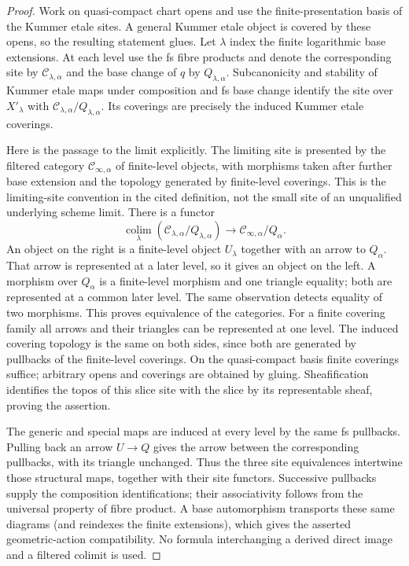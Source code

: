 \documentclass[11pt]{article}
\theoremstyle{definition}
\theoremstyle{remark}
\begin{document}
\begin{proof}
Work on quasi-compact chart opens and use the finite-presentation
basis of the Kummer etale sites.  A general Kummer etale object is
covered by these opens, so the resulting statement glues.
Let $\lambda$ index the finite logarithmic base extensions.  At each
level use the fs fibre products and denote the corresponding site
by $\mathcal C_{\lambda,\alpha}$ and the base change of $q$ by
$Q_{\lambda,\alpha}$.  Subcanonicity and stability of Kummer etale
maps under composition and fs base change identify the site over
$X'_\lambda$ with
$\mathcal C_{\lambda,\alpha}/Q_{\lambda,\alpha}$.
Its coverings are precisely the induced Kummer etale coverings.

Here is the passage to the limit explicitly.  The limiting site is
presented by the filtered category $\mathcal C_{\infty,\alpha}$
of finite-level objects, with morphisms taken after further base
extension and the topology generated by finite-level coverings.
This is the limiting-site convention in the cited definition, not
the small site of an unqualified underlying scheme limit.
There is a functor
\[
 \operatorname*{colim}_\lambda
 (\mathcal C_{\lambda,\alpha}/Q_{\lambda,\alpha})
 \longrightarrow \mathcal C_{\infty,\alpha}/Q_\alpha.
\]
An object on the right is a finite-level object $U_\lambda$ together
with an arrow to $Q_\alpha$.  That arrow is represented at a later
level, so it gives an object on the left.  A morphism over $Q_\alpha$
is a finite-level morphism and one triangle equality; both are
represented at a common later level.  The same observation detects
equality of two morphisms.  This proves equivalence of the categories.
For a finite covering family all arrows and their triangles can be
represented at one level.  The induced covering topology is the
same on both sides, since both are generated by pullbacks of the
finite-level coverings.  On the quasi-compact basis finite coverings
suffice; arbitrary opens and coverings are obtained by gluing.
Sheafification identifies the topos of this slice site with the
slice by its representable sheaf, proving the assertion.

The generic and special maps are induced at every level by the
same fs pullbacks.  Pulling back an arrow $U\to Q$ gives the arrow
between the corresponding pullbacks, with its triangle unchanged.
Thus the three site equivalences intertwine those structural maps,
together with their site functors.  Successive pullbacks supply
the composition identifications; their associativity follows from
the universal property of fibre product.  A base automorphism
transports these same diagrams (and reindexes the finite extensions),
which gives the asserted geometric-action compatibility.  No formula
interchanging a derived direct image and a filtered colimit is used.
\end{proof}
\end{document}
